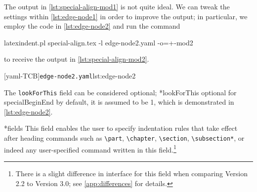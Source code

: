 	The output in \cref{lst:special-align-mod1} is not quite ideal. We can tweak the settings
	within \cref{lst:edge-node1} in order to improve the output; in particular, we employ the
	code in \cref{lst:edge-node2} and run the command 
	 
	\begin{commandshell}
latexindent.pl special-align.tex -l edge-node2.yaml -o=+-mod2
\end{commandshell}
	to receive the output in \cref{lst:special-align-mod2}.
	 

	\begin{cmhtcbraster}[ raster left skip=-3.5cm,]
		[yaml-TCB]{\texttt{edge-node2.yaml}}{lst:edge-node2}
	\end{cmhtcbraster}

	The \texttt{lookForThis} field can be considered optional;
	*{lookForThis optional for specialBeginEnd} by default, it is
	assumed to be 1, which is demonstrated in \cref{lst:edge-node2}.%

*{fields}
	This field enables the user to specify indentation rules that take effect after heading
	commands such as \lstinline!\part!, \lstinline!\chapter!, \lstinline!\section!,
	\lstinline!\subsection*!, or indeed any user-specified command written in this
	field.\footnote{There is a slight difference in interface for this field when comparing
	Version 2.2 to Version 3.0; see \vref{app:differences} for details.}

